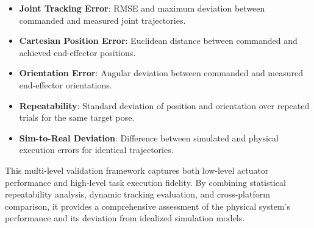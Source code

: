 \documentclass[conference]{IEEEtran}
\begin{document}
	\begin{itemize}
		\item \textbf{Joint Tracking Error}: RMSE and maximum deviation between commanded and measured joint trajectories.
		
		\item \textbf{Cartesian Position Error}: Euclidean distance between commanded and achieved end-effector positions.
		
		\item \textbf{Orientation Error}: Angular deviation between commanded and measured end-effector orientations.
		
		\item \textbf{Repeatability}: Standard deviation of position and orientation over repeated trials for the same target pose.
		
		\item \textbf{Sim-to-Real Deviation}: Difference between simulated and physical execution errors for identical trajectories.
	\end{itemize}
	
	This multi-level validation framework captures both low-level actuator performance and high-level task execution fidelity. By combining statistical repeatability analysis, dynamic tracking evaluation, and cross-platform comparison, it provides a comprehensive assessment of the physical system’s performance and its deviation from idealized simulation models.
	
\end{document}
